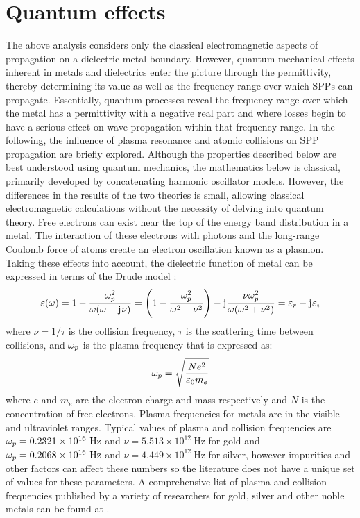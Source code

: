 \documentclass[11pt]{article}
\begin{document}
\section{Quantum effects}
%
The above analysis considers only the classical electromagnetic aspects of propagation on a dielectric metal boundary. However, quantum mechanical effects inherent in metals and dielectrics enter the picture through the permittivity, thereby determining its value as well as the frequency range over which SPPs can propagate. Essentially, quantum processes reveal the frequency range over which the metal has a permittivity with a negative real part and where losses begin to have a serious effect on wave propagation within that frequency range. In the following, the influence of plasma resonance and atomic collisions on SPP propagation are briefly explored.  Although the properties described below are best understood using quantum mechanics, the mathematics below is classical, primarily developed by concatenating harmonic oscillator models. However, the differences in the results of the two theories is small, allowing classical electromagnetic calculations without the necessity of delving into quantum theory.
Free electrons can exist near the top of the energy band distribution in a metal. The interaction of these electrons with photons and the long-range Coulomb force of atoms create an electron oscillation known as a plasmon. Taking these effects into account, the dielectric function of metal can be expressed in terms of the Drude model \cite{MaxBorn2002}:
%
\begin{equation}
  \varepsilon(\omega) = 1 - \frac{\omega_p^2}{\omega(\omega  - \mathrm{j}\mkern1mu \nu)} = \left(1 - \frac{\omega_p^2}{\omega^2 + \nu^2} \right) - \mathrm{j}\mkern1mu \frac{\nu \omega_p^2}{\omega (\omega^2 + \nu^2)} = \varepsilon_r - \mathrm{j}\mkern1mu \varepsilon_i
  \label{eq:drude}
\end{equation}
%
where $\nu = 1/\tau$ is the collision frequency, $\tau$ is the scattering time between collisions, and $\omega_p$ is the plasma frequency that is expressed as:
%
\begin{equation}
  \omega_p = \sqrt{\frac{N e^2}{\varepsilon_0 m_e}}
  \label{eq:plasma_f}
\end{equation}
%
where $e$ and $m_e$ are the electron charge and mass respectively and $N$ is the concentration of free electrons. Plasma frequencies for metals are in the visible and ultraviolet ranges. Typical values of plasma and collision frequencies are $\omega_p = 0.2321 \times 10^{16}~\mathrm{Hz}$ and
$\nu = 5.513 \times 10^{12}~\mathrm{Hz}$ for gold and $\omega_p = 0.2068 \times 10^{16}~\mathrm{Hz}$ and $\nu = 4.449 \times 10^{12}~\mathrm{Hz}$ for silver, however impurities and other factors can affect these numbers so the literature does not have a unique set of values for these parameters. A comprehensive list of plasma and collision frequencies published by a variety of researchers for gold, silver and other noble metals can be found at \cite{Moroz2010}.
\end{document}
